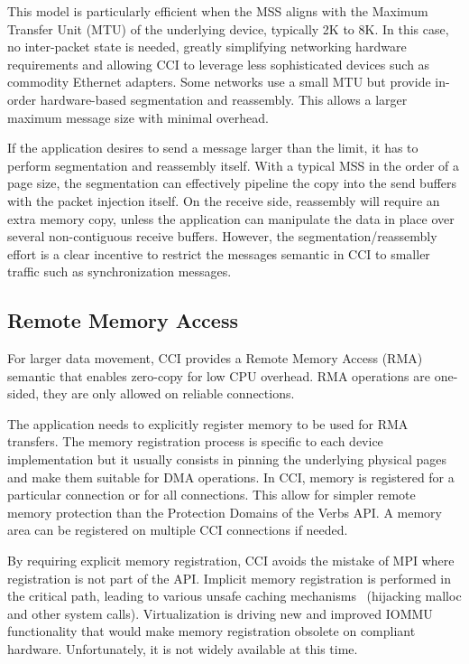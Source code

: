 This model is particularly efficient when the MSS aligns with the Maximum 
Transfer Unit (MTU) of the underlying device, typically 2K to 8K. 
In this case, no inter-packet state is needed, greatly simplifying
networking hardware requirements and allowing CCI to leverage less 
sophisticated devices such as commodity Ethernet adapters. 
Some networks use a small MTU but 
provide in-order hardware-based segmentation and reassembly. This allows a larger maximum message size with minimal overhead.

If the application desires to send a message larger than the limit, it has 
to perform segmentation and reassembly itself. With a typical MSS in the order 
of a page size, the segmentation can effectively pipeline the copy into the 
send buffers with the packet injection itself. On the receive side, 
reassembly will require an extra memory copy, unless the application can 
manipulate the data in place over several non-contiguous receive buffers.
However, the segmentation/reassembly effort is a clear incentive 
to restrict the messages semantic in CCI to smaller traffic 
such as synchronization messages.

\subsection{Remote Memory Access}
For larger data movement, CCI provides a Remote Memory Access (RMA) semantic 
that enables zero-copy for low CPU overhead. RMA operations are one-sided, 
they are only allowed on reliable connections. 

The application needs to explicitly register memory to be used for RMA 
transfers. The memory registration process is specific to each device 
implementation but it usually consists in pinning the underlying physical 
pages and make them suitable for DMA operations. In CCI, memory is registered 
for a particular connection or for all connections. This allow for simpler 
remote memory protection than the Protection Domains of the Verbs API. A 
memory area can be registered on multiple CCI connections if needed.

By requiring explicit memory registration, CCI avoids the mistake of MPI 
where registration is not part of the API. Implicit memory registration is performed in the critical 
path, leading to various unsafe caching mechanisms~\cite{regcache} 
(hijacking malloc and other system calls). 
Virtualization is driving new and improved IOMMU functionality 
that would make memory registration obsolete on compliant hardware. 
Unfortunately, it is not widely available at this time.

